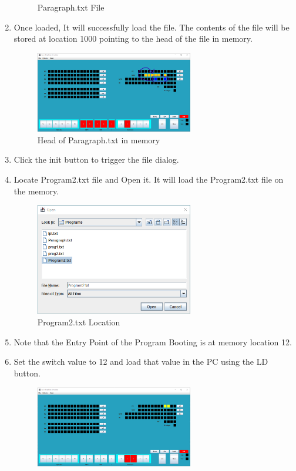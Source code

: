 \documentclass[10pt]{article}
\begin{document}
\begin{enumerate}
\begin{figure}[H]
    \caption{Paragraph.txt File}
    \label{fig:ParaFile}
  \end{figure}
  \item Once loaded, It will successfully load the file. The contents of the file will be stored at
  location 1000 pointing to the head of the file in memory.
  \begin{figure}[H]
    \centering
    \includegraphics[width=0.65\textwidth]{Pics/Fig21.png}
    \caption{Head of Paragraph.txt in memory}
    \label{fig:BaseAddrPara}
  \end{figure}
  \item Click the init button to trigger the file dialog.
  \item Locate Program2.txt file and Open it. It will load the Program2.txt file on the memory.
  \begin{figure}[H]
    \centering
    \includegraphics[width=0.65\textwidth]{Pics/Fig19.png}
    \caption{Program2.txt Location}
    \label{fig:Program2}
  \end{figure}
  \item Note that the Entry Point of the Program Booting is at memory location 12.
  \item Set the switch value to 12 and load that value in the PC using the LD button.
  \begin{figure}[H]
    \centering
    \includegraphics[width=0.65\textwidth]{Pics/Fig22.png}

\end{figure}
\end{enumerate}
\end{document}
